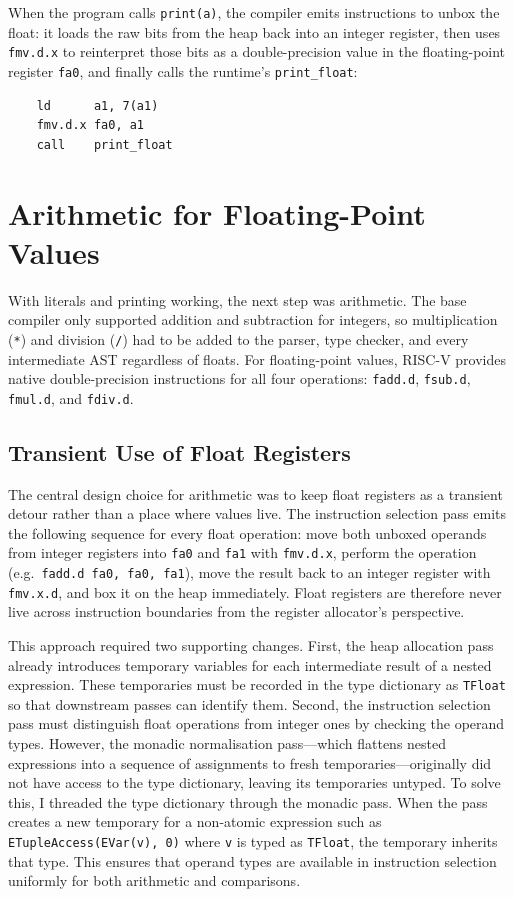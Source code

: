 When the program calls \texttt{print(a)}, the compiler emits instructions to unbox the float: it loads the raw bits from the heap back into an integer register, then uses \texttt{fmv.d.x} to reinterpret those bits as a double-precision value in the floating-point register \texttt{fa0}, and finally calls the runtime's \texttt{print\_float}:

\begin{lstlisting}
    ld      a1, 7(a1)
    fmv.d.x fa0, a1
    call    print_float
\end{lstlisting}

\section{Arithmetic for Floating-Point Values}

With literals and printing working, the next step was arithmetic. The base compiler only supported addition and subtraction for integers, so multiplication (\texttt{*}) and division (\texttt{/}) had to be added to the parser, type checker, and every intermediate AST regardless of floats. For floating-point values, RISC-V provides native double-precision instructions for all four operations: \texttt{fadd.d}, \texttt{fsub.d}, \texttt{fmul.d}, and \texttt{fdiv.d}.

\subsection{Transient Use of Float Registers}\label{sec:transient-float-registers}

The central design choice for arithmetic was to keep float registers as a transient detour rather than a place where values live. The instruction selection pass emits the following sequence for every float operation: move both unboxed operands from integer registers into \texttt{fa0} and \texttt{fa1} with \texttt{fmv.d.x}, perform the operation (e.g.\ \texttt{fadd.d fa0, fa0, fa1}), move the result back to an integer register with \texttt{fmv.x.d}, and box it on the heap immediately. Float registers are therefore never live across instruction boundaries from the register allocator's perspective.

This approach required two supporting changes. First, the heap allocation pass already introduces temporary variables for each intermediate result of a nested expression. These temporaries must be recorded in the type dictionary as \texttt{TFloat} so that downstream passes can identify them. Second, the instruction selection pass must distinguish float operations from integer ones by checking the operand types. However, the monadic normalisation pass---which flattens nested expressions into a sequence of assignments to fresh temporaries---originally did not have access to the type dictionary, leaving its temporaries untyped. To solve this, I threaded the type dictionary through the monadic pass. When the pass creates a new temporary for a non-atomic expression such as \texttt{ETupleAccess(EVar(v), 0)} where \texttt{v} is typed as \texttt{TFloat}, the temporary inherits that type. This ensures that operand types are available in instruction selection uniformly for both arithmetic and comparisons.


